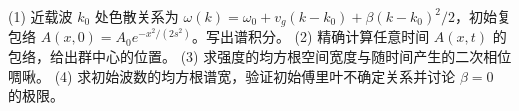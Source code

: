 (1) 近载波 \(k_0\) 处色散关系为 \(\omega(k)=\omega_0+v_g(k-k_0)+\beta(k-k_0)^2/2\)，初始复包络 \(A(x,0)=A_0e^{-x^2/(2s^2)}\)。写出谱积分。
(2) 精确计算任意时间 \(A(x,t)\) 的包络，给出群中心的位置。
(3) 求强度的均方根空间宽度与随时间产生的二次相位啁啾。
(4) 求初始波数的均方根谱宽，验证初始傅里叶不确定关系并讨论 \(\beta=0\) 的极限。
